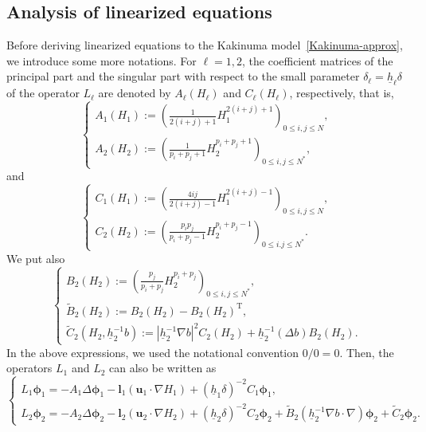 \documentclass[11pt,leqno]{article}
\numberwithin{equation}{section}
\numberwithin{figure}{section}
\begin{document}
\subsection{Analysis of linearized equations}\label{Analysis-LEs}
%
Before deriving linearized equations to the Kakinuma model~\eqref{Kakinuma-approx}, 
we introduce some more notations. 
For $\ell=1,2$, the coefficient matrices of the principal part and the singular part with respect to 
the small parameter $\delta_\ell=\underline{h}_\ell\delta$ of the operator $L_{\ell}$ are denoted by 
$A_\ell(H_\ell)$ and $C_\ell(H_\ell)$, respectively, that is, 
%
\begin{equation}\label{def-A}
\begin{cases}
 \displaystyle
 A_1(H_1) := \left( \frac{1}{2(i+j)+1}H_1^{2(i+j)+1} \right)_{0\leq i,j\leq N}, \\
 \displaystyle
 A_2(H_2) := \left( \frac{1}{p_i+p_j+1}H_2^{p_i+p_j+1} \right)_{0\leq i,j\leq N^*}, 
\end{cases}
\end{equation}
%
and 
%
\begin{equation}\label{def-C}
\begin{cases}
 \displaystyle
 C_1(H_1) := \left( \frac{4ij}{2(i+j)-1}H_1^{2(i+j)-1} \right)_{0\leq i,j\leq N}, \\
 \displaystyle
 C_2(H_2) := \left( \frac{p_ip_j}{p_i+p_j-1}H_2^{p_i+p_j-1} \right)_{0\leq i.j\leq N^*}.
\end{cases}
\end{equation}
%
We put also 
%
\begin{equation}\label{def-B2}
\begin{cases}
 \displaystyle
 B_2(H_2) := \left( \frac{p_j}{p_i+p_j}H_2^{p_i+p_j} \right)_{0\leq i,j\leq N^*}, \\
 \tilde{B}_2(H_2) := B_2(H_2) - B_2(H_2)^\mathrm{T}, \\
 \tilde{C}_2(H_2,\underline{h}_2^{-1}b) := |\underline{h}_2^{-1}\nabla b|^2 C_2(H_2) + \underline{h}_2^{-1}(\Delta b)B_2(H_2). 
\end{cases}
\end{equation}
%
In the above expressions, we used the notational convention $0/0 = 0$.
Then, the operators $L_1$ and $L_2$ can also be written as 
%
\begin{equation}\label{AE-L}
\begin{cases}
 L_1\bm{\phi}_1 = -A_1\Delta\bm{\phi}_1 - \bm{l}_1(\bm{u}_1\cdot\nabla H_1) + (\underline{h}_1\delta)^{-2}C_1\bm{\phi}_1, \\
 L_2\bm{\phi}_2 = -A_2\Delta\bm{\phi}_2 - \bm{l}_2(\bm{u}_2\cdot\nabla H_2) + (\underline{h}_2\delta)^{-2}C_2\bm{\phi}_2
  + \tilde{B}_2 (\underline{h}_2^{-1}\nabla b\cdot\nabla)\bm{\phi}_2 + \tilde{C}_2\bm{\phi}_2. 
\end{cases}
\end{equation}
\end{document}
